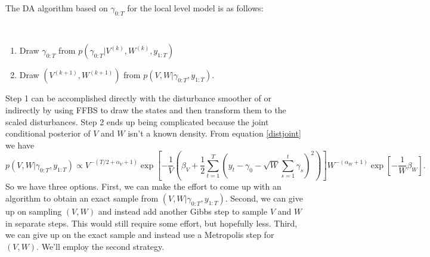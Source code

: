 








The DA algorithm based on $\gamma_{0:T}$ for the local level model is as follows: 
\begin{alg}\mbox{}\\[-\baselineskip]
\begin{enumerate}\label{distalg}
  \item Draw $\gamma_{0:T}$ from $p(\gamma_{0:T}|V^{(k)},W^{(k)},y_{1:T})$
  \item Draw $(V^{(k+1)},W^{(k+1)})$ from $p(V,W|\gamma_{0:T},y_{1:T})$.
\end{enumerate}
\end{alg}
Step 1 can be accomplished directly with the disturbance smoother of \citet{koopman1993disturbance} or indirectly by using FFBS to draw the states and then transform them to the scaled disturbances. Step 2 ends up being complicated because the joint conditional posterior of $V$ and $W$ isn't a known density. From equation \eqref{distjoint} we have
\[
p(V,W|\gamma_{0:T},y_{1:T})\propto V^{-\left(T/2 + \alpha_V + 1\right)} \exp\left[-\frac{1}{V}\left(\beta_V + \frac{1}{2} \textstyle\sum_{t=1}^T\left(y_t-\gamma_0 - \sqrt{W}\textstyle\sum_{s=1}^{t}\gamma_s\right)^2\right)\right] W^{-\left(\alpha_W + 1\right)} \exp\left[-\frac{1}{W}\beta_W\right].
\]
So we have three options. First, we can make the effort to come up with an algorithm to obtain an exact sample from $(V,W|\gamma_{0:T},y_{1:T})$. Second, we can give up on sampling $(V,W)$ and instead add another Gibbs step to sample $V$ and $W$ in separate steps. This would still require some effort, but hopefully less. Third, we can give up on the exact sample and instead use a Metropolis step for $(V,W)$. We'll employ the second strategy. 

